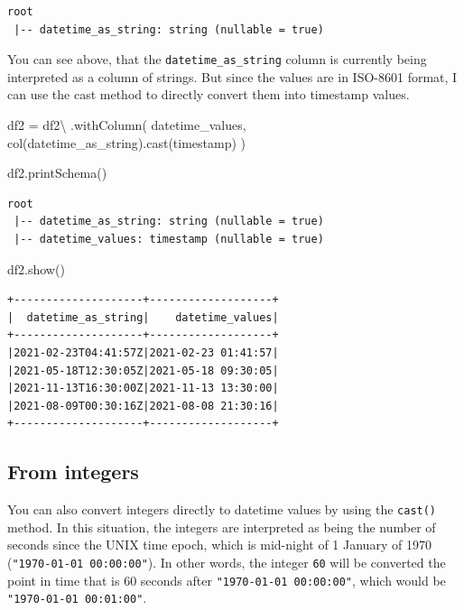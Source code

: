 \documentclass[
  11pt,
  letterpaper,
  DIV=11,
  numbers=noendperiod]{scrreprt}
\newenvironment{Shaded}{\begin{snugshade}}{\end{snugshade}}
\newcommand{\NormalTok}[1]{\textcolor[rgb]{0.00,0.23,0.31}{#1}}
\newcommand{\OperatorTok}[1]{\textcolor[rgb]{0.37,0.37,0.37}{#1}}
\newcommand{\StringTok}[1]{\textcolor[rgb]{0.13,0.47,0.30}{#1}}
\begin{document}
\begin{verbatim}
root
 |-- datetime_as_string: string (nullable = true)
\end{verbatim}

You can see above, that the \texttt{datetime\_as\_string} column is
currently being interpreted as a column of strings. But since the values
are in ISO-8601 format, I can use the cast method to directly convert
them into timestamp values.

\begin{Shaded}
\begin{Highlighting}[]
\NormalTok{df2 }\OperatorTok{=}\NormalTok{ df2}\OperatorTok{\textbackslash{}}
\NormalTok{    .withColumn(}
        \StringTok{\textquotesingle{}datetime\_values\textquotesingle{}}\NormalTok{,}
\NormalTok{        col(}\StringTok{\textquotesingle{}datetime\_as\_string\textquotesingle{}}\NormalTok{).cast(}\StringTok{\textquotesingle{}timestamp\textquotesingle{}}\NormalTok{)}
\NormalTok{    )}

\NormalTok{df2.printSchema()}
\end{Highlighting}
\end{Shaded}

\begin{verbatim}
root
 |-- datetime_as_string: string (nullable = true)
 |-- datetime_values: timestamp (nullable = true)
\end{verbatim}

\begin{Shaded}
\begin{Highlighting}[]
\NormalTok{df2.show()}
\end{Highlighting}
\end{Shaded}

\begin{verbatim}
+--------------------+-------------------+
|  datetime_as_string|    datetime_values|
+--------------------+-------------------+
|2021-02-23T04:41:57Z|2021-02-23 01:41:57|
|2021-05-18T12:30:05Z|2021-05-18 09:30:05|
|2021-11-13T16:30:00Z|2021-11-13 13:30:00|
|2021-08-09T00:30:16Z|2021-08-08 21:30:16|
+--------------------+-------------------+
\end{verbatim}

\subsection{From integers}\label{from-integers}

You can also convert integers directly to datetime values by using the
\texttt{cast()} method. In this situation, the integers are interpreted
as being the number of seconds since the UNIX time epoch, which is
mid-night of 1 January of 1970 (\texttt{"1970-01-01\ 00:00:00"}). In
other words, the integer \texttt{60} will be converted the point in time
that is 60 seconds after \texttt{"1970-01-01\ 00:00:00"}, which would be
\texttt{"1970-01-01\ 00:01:00"}.
\end{document}

